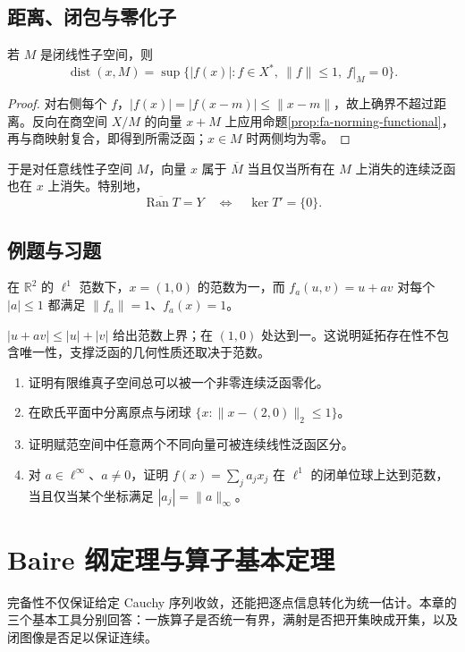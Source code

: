 \documentclass[UTF8,12pt,a4paper,fontset=fandol]{ctexbook}
\begin{document}
\section{距离、闭包与零化子}
\begin{proposition}\label{prop:fa-distance-dual}
若 $M$ 是闭线性子空间，则
\[
 \operatorname{dist}(x,M)=
 \sup\{|f(x)|:f\in X^*,\ \|f\|\leq1,\ f|_M=0\}.
\]
\end{proposition}
\begin{proof}
对右侧每个 $f$，$|f(x)|=|f(x-m)|\leq\|x-m\|$，故上确界不超过距离。反向在商空间 $X/M$ 的向量 $x+M$ 上应用命题\ref{prop:fa-norming-functional}，再与商映射复合，即得到所需泛函；$x\in M$ 时两侧均为零。
\end{proof}
于是对任意线性子空间 $M$，向量 $x$ 属于 $\overline M$ 当且仅当所有在 $M$ 上消失的连续泛函也在 $x$ 上消失。特别地，
\[
 \overline{\operatorname{Ran}T}=Y\quad\Longleftrightarrow\quad\ker T'=\{0\}.
\]

\section{例题与习题}
\begin{example}[支撑泛函可以不唯一]
在 $\mathbb R^2$ 的 $\ell^1$ 范数下，$x=(1,0)$ 的范数为一，而 $f_a(u,v)=u+av$ 对每个 $|a|\leq1$ 都满足 $\|f_a\|=1$、$f_a(x)=1$。
\end{example}
\begin{solve}
$|u+av|\leq|u|+|v|$ 给出范数上界；在 $(1,0)$ 处达到一。这说明延拓存在性不包含唯一性，支撑泛函的几何性质还取决于范数。
\end{solve}
\begin{enumerate}
 \item 证明有限维真子空间总可以被一个非零连续泛函零化。
 \item 在欧氏平面中分离原点与闭球 $\{x:\|x-(2,0)\|_2\leq1\}$。
 \item 证明赋范空间中任意两个不同向量可被连续线性泛函区分。
 \item 对 $a\in\ell^\infty$、$a\ne0$，证明 $f(x)=\sum_ja_jx_j$ 在 $\ell^1$ 的闭单位球上达到范数，当且仅当某个坐标满足 $|a_j|=\|a\|_\infty$。
\end{enumerate}

\chapter{Baire 纲定理与算子基本定理}
\label{chap:fa-baire}

完备性不仅保证给定 Cauchy 序列收敛，还能把逐点信息转化为统一估计。本章的三个基本工具分别回答：一族算子是否统一有界，满射是否把开集映成开集，以及闭图像是否足以保证连续。
\end{document}
